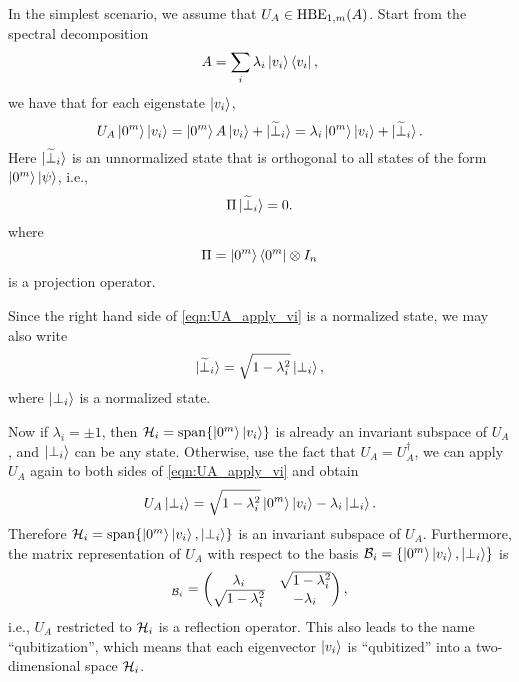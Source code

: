 In the simplest scenario, we assume that $U_A\in\operatorname{HBE}_{1,m}(A)$.
Start from the spectral decomposition
\begin{equation}
A=\sum_{i} \lambda_i \ket{v_i}\bra{v_i},
\label{eqn:eigdecompose_herm}
\end{equation}
we have that for each eigenstate $\ket{v_i}$,
\begin{equation}
U_A\ket{0^m}\ket{v_i}=\ket{0^m}A\ket{v_i}+\ket{\widetilde{\perp}_i}=\lambda_i\ket{0^m}\ket{v_i}+\ket{\widetilde{\perp}_i}.
\label{eqn:UA_apply_vi}
\end{equation}
Here $\ket{\widetilde{\perp}_i}$ is an unnormalized state that is orthogonal to all states of the form $\ket{0^m}\ket{\psi}$, i.e.,
\begin{equation}
\Pi\ket{\widetilde{\perp}_i}=0.
\end{equation}
where
\begin{equation}
\Pi=\ket{0^m}\bra{0^m}\otimes I_n
\label{eqn:projection}
\end{equation}
is a projection operator.

Since the right hand side of \cref{eqn:UA_apply_vi} is a normalized state,
we may also write
\begin{equation}
\ket{\widetilde{\perp}_i}=\sqrt{1-\lambda_i^2}\ket{\perp_i},
\end{equation}
where $\ket{\perp_i}$ is a normalized state.

Now if $\lambda_i=\pm 1$, then $\mathcal{H}_i=\operatorname{span}\{\ket{0^m}\ket{v_i}\}$ is already an invariant subspace of $U_A$, and $\ket{\perp_i}$ can be any state.
Otherwise, use the fact that $U_A=U_A^{\dag}$, we can apply $U_A$ again to both sides of \cref{eqn:UA_apply_vi} and obtain
\begin{equation}
U_A\ket{\perp_i}=\sqrt{1-\lambda_i^2}\ket{0^m}\ket{v_i}-\lambda_i\ket{\perp_i}.
\label{eqn:UA_apply_perpi}
\end{equation}
Therefore $\mathcal{H}_i=\operatorname{span}\{\ket{0^m}\ket{v_i},\ket{\perp_i}\}$ is an invariant subspace of $U_A$. 
Furthermore, the matrix representation of $U_A$ with respect to the basis $\mathcal{B}_i=\{\ket{0^m}\ket{v_i},\ket{\perp_i}\}$ is
\begin{equation}
[U_A]_{\mc{B}_i}=\begin{pmatrix}
\lambda_i & \sqrt{1-\lambda_i^2}\\
\sqrt{1-\lambda_i^2} & -\lambda_i
\end{pmatrix},
\end{equation}
i.e., $U_A$ restricted to $\mathcal{H}_i$ is a reflection operator.
This also leads to the name ``qubitization'', which means that each eigenvector $\ket{v_i}$ is ``qubitized'' into a two-dimensional space $\mathcal{H}_i$.

